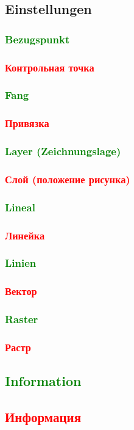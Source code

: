 \documentclass[14pt,a4paper]{book}
\newcommand{\DE}[1]{\textcolor{green}{#1}}
\newcommand{\RU}[1]{\textcolor{red}{#1}}
\begin{document}
		\subsection{Einstellungen}
			\DE{\subsubsection{Bezugspunkt}} 
			\RU{\subsubsection{Контрольная точка}} 
			\DE{\subsubsection{Fang}}
			\RU{\subsubsection{Привязка}}
 			\DE{\subsubsection{Layer (Zeichnungslage)}}
 			\RU{\subsubsection{Слой (положение рисунка)}} 
			\DE{\subsubsection{Lineal}}
			\RU{\subsubsection{Линейка}}
			\DE{\subsubsection{Linien}}
			\RU{\subsubsection{Вектор}}
			\DE{\subsubsection{Raster}}
			\RU{\subsubsection{Растр}}
		\DE{\subsection{Information}}
		\RU{\subsection{Информация}}
\end{document}
